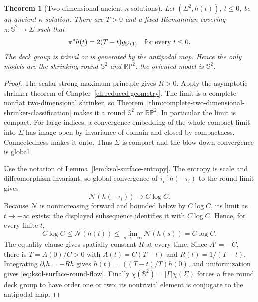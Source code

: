 \documentclass[10pt]{coll-l}
\newcommand{\Sph}{\mathbb{S}}
\newtheorem{theorem}{Theorem}[chapter]
\theoremstyle{definition}
\theoremstyle{remark}
\numberwithin{section}{chapter}
\numberwithin{equation}{chapter}
\begin{document}
\begin{theorem}[Two-dimensional ancient $\kappa$-solutions]
\label{thm:ksol-two-dimensional-classification}
Let $(\Sigma^2,h(t))$, $t\leq0$, be an ancient $\kappa$-solution.  There
are $T>0$ and a fixed Riemannian covering $\pi:\Sph^2\to\Sigma$ such that
\begin{equation}
             \pi^*h(t)=2(T-t)g_{\Sph^2(1)}
             \quad\hbox{for every }t\leq0.             \label{eq:ksol-surface-round-flow}
\end{equation}
The deck group is trivial or is generated by the antipodal map.  Hence the
only models are the shrinking round $\Sph^2$ and $\mathbb{RP}^2$; the
oriented model is $\Sph^2$.
\end{theorem}

\begin{proof}
The scalar strong maximum principle gives $R>0$.  Apply the asymptotic
shrinker theorem of Chapter~\ref{ch:reduced-geometry}.  The limit is a
complete nonflat two-dimensional shrinker, so
Theorem~\ref{thm:complete-two-dimensional-shrinker-classification} makes it
a round $\Sph^2$ or $\mathbb{RP}^2$.  In particular the limit is compact.
For large indices, a convergence embedding of the whole compact limit into
$\Sigma$ has image open by invariance of domain and closed by compactness.
Connectedness makes it onto.  Thus $\Sigma$ is compact and the blow-down
convergence is global.

Use the notation of Lemma~\ref{lem:ksol-surface-entropy}.  The entropy is
scale and diffeomorphism invariant, so global convergence of
$\tau_i^{-1}h(-\tau_i)$ to the round limit gives
\begin{equation}
                    \mathcal N(h(-\tau_i))\longrightarrow C\log C.       \label{eq:ksol-surface-entropy-backward-limit}
\end{equation}
Because $\mathcal N$ is nonincreasing forward and bounded below by
$C\log C$, its limit as $t\to-\infty$ exists; the displayed subsequence
identifies it with $C\log C$.  Hence, for every finite $t$,
\[
 C\log C\leq\mathcal N(h(t))
       \leq\lim_{s\to-\infty}\mathcal N(h(s))=C\log C.
\]
The equality clause gives spatially constant $R$ at every time.  Since
$A'=-C$, there is $T=A(0)/C>0$ with $A(t)=C(T-t)$ and
$R(t)=1/(T-t)$.  Integrating $\partial_t h=-Rh$ gives
$h(t)=((T-t)/T)h(0)$, and uniformization gives
\eqref{eq:ksol-surface-round-flow}.  Finally
$\chi(\Sph^2)=|\Gamma|\chi(\Sigma)$ forces a free round deck group to have
order one or two; its nontrivial element is conjugate to the antipodal map.
\end{proof}
\end{document}
